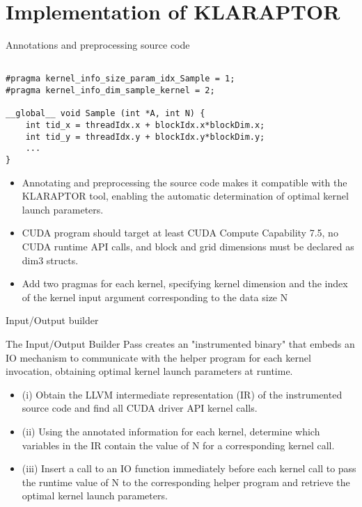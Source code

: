 \section{Implementation of KLARAPTOR}

\begin{frame}[fragile]{Annotations and preprocessing source code}
    \begin{block}{}
        \begin{verbatim}
        
#pragma kernel_info_size_param_idx_Sample = 1; 
#pragma kernel_info_dim_sample_kernel = 2;

__global__ void Sample (int *A, int N) { 
    int tid_x = threadIdx.x + blockIdx.x*blockDim.x;
    int tid_y = threadIdx.y + blockIdx.y*blockDim.y;
    ...
}
        \end{verbatim}
        \begin{itemize}
            \item Annotating and preprocessing the source code makes it compatible with the KLARAPTOR tool, 
            enabling the automatic determination of optimal kernel launch parameters.
            \item CUDA program should target at least CUDA Compute Capability 7.5, no CUDA runtime API calls, 
            and block and grid dimensions must be declared as dim3 structs.
            \item Add two pragmas for each kernel, specifying kernel dimension and the 
            index of the kernel input argument corresponding to the data size N
        \end{itemize}
    \end{block} 
\end{frame}

\begin{frame}{Input/Output builder}
    \begin{block}{}
        The Input/Output Builder Pass creates an "instrumented binary" that embeds an IO mechanism to communicate with the 
        helper program for each kernel invocation, obtaining optimal kernel launch parameters at runtime.
        \begin{itemize}
            \item (i) Obtain the LLVM intermediate representation (IR) of the instrumented source code and find all CUDA driver 
            API kernel calls.
            \item (ii) Using the annotated information for each kernel, determine which variables in the IR contain the value 
            of N for a corresponding kernel call.
            \item (iii) Insert a call to an IO function immediately before each kernel call to pass the runtime value of N to 
            the corresponding helper program and retrieve the optimal kernel launch parameters.
        \end{itemize}
    \end{block}
\end{frame}

